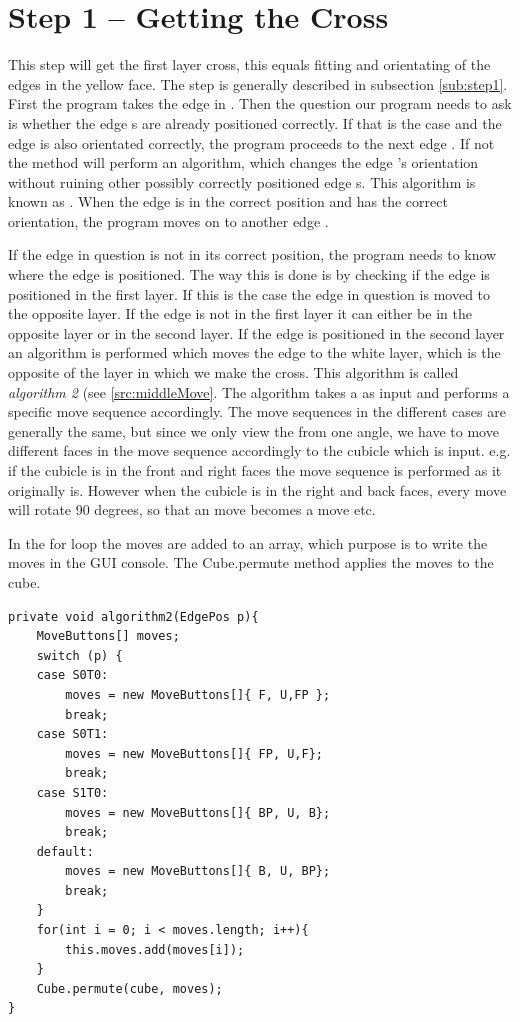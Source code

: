 \section{Step 1 -- Getting the Cross}
This step will get the first layer cross, this equals fitting and orientating of the edges in the yellow face. 
The step is generally described in subsection \ref{sub:step1}.
First the program takes the edge \cubie{} in \cubicle{} .
Then the question our program needs to ask is whether the edge \cpiece{}s are already positioned correctly.
If that is the case and the edge \cpiece{} is also orientated correctly, the program proceeds to the next edge \cpiece{}.
If not the method will perform an algorithm, which changes the edge \cpiece{}'s orientation without ruining other possibly correctly positioned edge \cpiece{}s. 
This algorithm is known as . When the edge \cpiece{} is in the correct position and has the correct orientation, the program moves on to another edge \cpiece{}. 

If the edge \cpiece{} in question is not in its correct position, the program needs to know where the edge is positioned. 
The way this is done is by checking if the edge \cpiece{} is positioned in the first layer. 
If this is the case the edge \cpiece{} in question is moved to the opposite layer. 
If the edge \cpiece{} is not in the first layer it can either be in the opposite layer or in the second layer.
If the edge \cpiece{} is positioned in the second layer an algorithm is performed which moves the edge \cpiece{} to the white layer, which is the opposite of the layer in which we make the cross. This algorithm is called \textit{algorithm 2} (see \ref{src:middleMove}. The algorithm takes a \cubicle{} as input and performs a specific move sequence accordingly. The move sequences in the different cases are generally the same, but since we only view the \rubik{} from one angle, we have to move different faces in the move sequence accordingly to the cubicle which is input. e.g. if the cubicle is in the front and right faces the move sequence is performed as it originally is. However when the cubicle is in the right and back faces, every move will rotate 90 degrees, so that an  move becomes a  move etc.

In the for loop the moves are added to an array, which purpose is to write the moves in the GUI console. 
The Cube.permute method applies the moves to the cube.

\begin{lstlisting}[style=sourceCode, caption=\myCaption{This is algorithm 2, which will move an edge piece from the middle layer to the top layer without ruining any edge pieces which are correctly positioned in the cross.}, label=src:middleMove, float=htb]
private void algorithm2(EdgePos p){
	MoveButtons[] moves;
	switch (p) {
	case S0T0:
		moves = new MoveButtons[]{ F, U,FP };
		break;
	case S0T1:
		moves = new MoveButtons[]{ FP, U,F};
		break;
	case S1T0:
		moves = new MoveButtons[]{ BP, U, B};
		break;
	default:
		moves = new MoveButtons[]{ B, U, BP};
		break;
	}
	for(int i = 0; i < moves.length; i++){
		this.moves.add(moves[i]);
	}
	Cube.permute(cube, moves);
}
\end{lstlisting}

